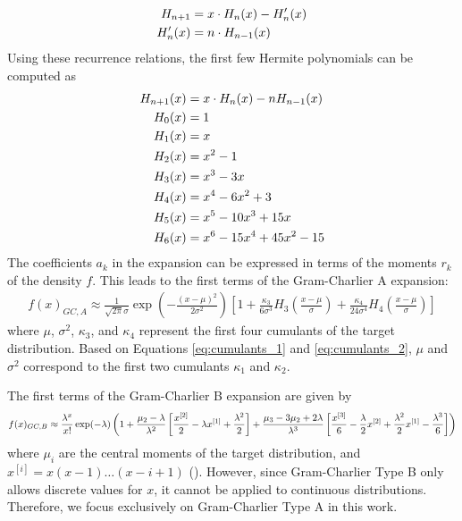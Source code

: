\begin{align}
    H_{n+1} &= x\cdot H_n(x) - H'_n(x) \notag \\
    H'_n(x) &= n\cdot H_{n-1}(x) \notag \\
\end{align}
Using these recurrence relations, the first few Hermite polynomials can be computed as
\begin{align}
    H_{n+1}(x) &= x\cdot H_n(x) - nH_{n-1}(x) \notag \\
    H_0(x) &= 1 \notag \\
    H_1(x) &= x \notag \\
    H_2(x) &= x^2 - 1 \notag \\
    H_3(x) &= x^3-3x \notag \\
    H_4(x) &= x^4-6x^2+3 \notag \\
    H_5(x) &= x^5-10x^3+15x \notag \\
    H_6(x) &= x^6-15x^4+45x^2-15 \notag
\end{align}
The coefficients $a_k$ in the expansion can be expressed in terms of the moments $r_k$ of the density $f$. This leads to the first terms of the Gram-Charlier A expansion:
\begin{align}
    \label{eq:gc_a_expansion_kappa}
    f(x)_{GC,A} \approx \frac{1}{\sqrt{2\pi}\sigma}\exp\left(-\frac{(x-\mu)^2}{2\sigma^2}\right) \left[1 + \frac{\kappa_3}{6\sigma^3}H_3\left(\frac{x-\mu}{\sigma}\right) + \frac{\kappa_4}{24\sigma^4}H_4\left(\frac{x-\mu}{\sigma}\right)\right]
\end{align}
where $\mu$, $\sigma^2$, $\kappa_3$, and $\kappa_4$ represent the first four cumulants of the target distribution. Based on Equations \eqref{eq:cumulants_1} and \eqref{eq:cumulants_2}, $\mu$ and $\sigma^2$ correspond to the first two cumulants $\kappa_1$ and $\kappa_2$.

The first terms of the Gram-Charlier B expansion are given by
\begin{align}
    f(x)_{GC,B} \approx \frac{\lambda^x}{x!}\exp(-\lambda) \left(1 + \frac{\mu_2 - \lambda}{\lambda^2}\left[\frac{x^{[2]}}{2} - \lambda x^{[1]} + \frac{\lambda^2}{2}\right] + \frac{\mu_3 - 3\mu_2 + 2\lambda}{\lambda^3}\left[\frac{x^{[3]}}{6} - \frac{\lambda}{2}x^{[2]} + \frac{\lambda^2}{2}x^{[1]} - \frac{\lambda^3}{6}\right]\right) \notag
\end{align}
where $\mu_i$ are the central moments of the target distribution, and $x^{[i]} = x(x-1)\dots (x-i+1)$ (\cite{mitropolskiiGramCharlierSeries2020}). However, since Gram-Charlier Type B only allows discrete values for $x$, it cannot be applied to continuous distributions. Therefore, we focus exclusively on Gram-Charlier Type A in this work.

